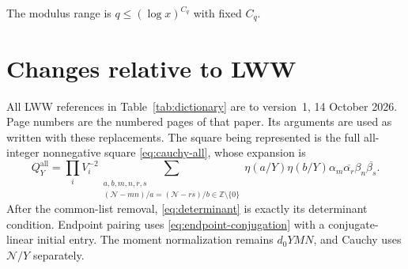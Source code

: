 \documentclass[11pt]{article}
\theoremstyle{definition}
\newcommand{\Z}{\mathbb Z}
\newcommand{\GN}{\mathcal N}
\newcommand{\QQ}{Q_Y^{\mathrm{all}}}
\theoremstyle{remark}
\numberwithin{equation}{section}
\begin{document}
The modulus range is $q\le(\log x)^{C_q}$ with fixed $C_q$.

\appendix
\section{Changes relative to LWW}
\label{app:dictionary}
All LWW references in Table~\ref{tab:dictionary} are to version~1,
14 October 2026. Page numbers are the numbered pages of that paper.
Its arguments are used as written with these replacements.
The square being represented is the full all-integer nonnegative
square \eqref{eq:cauchy-all}, whose expansion is
\begin{equation}\label{eq:all-expanded}
 \QQ=\prod_iV_i^{-2}
 \sum_{\substack{a,b,m,n,r,s\\
    (\GN-mn)/a=(\GN-rs)/b\in\Z\setminus\{0\}}}
 \eta(a/Y)\eta(b/Y)\alpha_m\overline{\alpha_r}
                    \beta_n\overline{\beta_s}.
\end{equation}
After the common-list removal, \eqref{eq:determinant} is exactly
its determinant condition. Endpoint pairing uses
\eqref{eq:endpoint-conjugation} with a conjugate-linear initial
entry. The moment normalization remains $d_0YMN$, and Cauchy uses
$\GN/Y$ separately.
\end{document}
